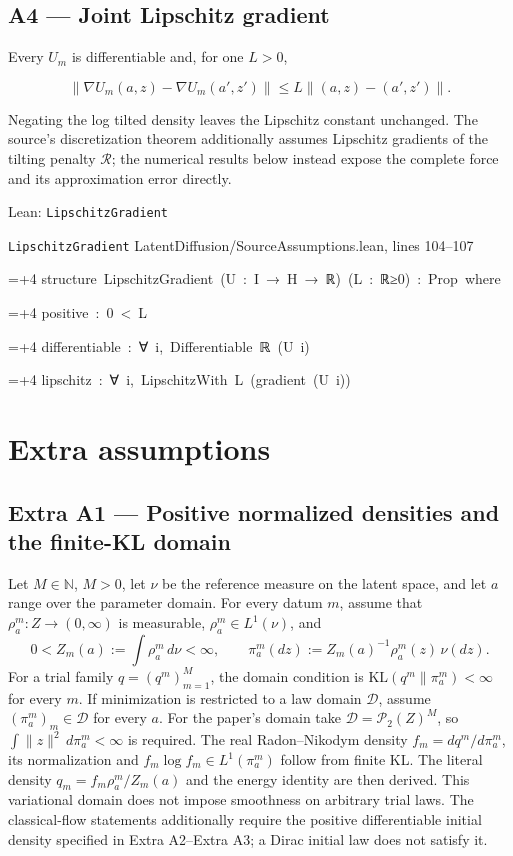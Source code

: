 \documentclass[11pt,a4paper]{report}
\newlength{\leancharwidth}
\newenvironment{leancode}{\par\smallskip\begingroup\ttfamily\footnotesize\raggedright
  \settowidth{\leancharwidth}{M}\setlength{\parskip}{0pt}\setlength{\parindent}{0pt}
  \frenchspacing}{\par\endgroup\smallskip}
\newcommand{\leanline}[2]{\hangindent=\dimexpr#1\leancharwidth+4\leancharwidth\relax
  \hangafter=1\noindent\hspace*{#1\leancharwidth}#2\par}
\newcommand{\leansource}[1]{\par{\footnotesize\color{leanmuted}#1}\par}
\begin{document}
\subsection{\texorpdfstring{A4 — Joint Lipschitz gradient}{A4 — Joint Lipschitz gradient}}



Every \(U_m\) is differentiable and, for one \(L>0\),



\[\|\nabla U_m(a,z)-\nabla U_m(a',z')\|\le L\|(a,z)-(a',z')\|.\]



Negating the log tilted density leaves the Lipschitz constant unchanged. The source's discretization theorem additionally assumes Lipschitz gradients of the tilting penalty \(\mathcal R\); the numerical results below instead expose the complete force and its approximation error directly.

\begin{leanbox}{Lean: \texttt{LipschitzGradient}}
\leansource{\texttt{LipschitzGradient} \quad LatentDiffusion/\allowbreak{}SourceAssumptions.lean, lines 104–107}
\begin{leancode}
\leanline{0}{structure\ LipschitzGradient\ (U\ :\ I\ →\ H\ →\ ℝ)\ (L\ :\ ℝ≥0)\ :\ Prop\ where}
\leanline{2}{positive\ :\ 0\ <\ L}
\leanline{2}{differentiable\ :\ ∀\ i,\ Differentiable\ ℝ\ (U\ i)}
\leanline{2}{lipschitz\ :\ ∀\ i,\ LipschitzWith\ L\ (gradient\ (U\ i))}
\end{leancode}
\end{leanbox}
\section{Extra assumptions}
\subsection{\texorpdfstring{Extra A1 — Positive normalized densities and the finite-KL domain}{Extra A1 — Positive normalized densities and the finite-KL domain}}


Let \(M\in\mathbb N\), \(M>0\), let \(\nu\) be the reference measure on the latent space, and let \(a\) range over the parameter domain. For every datum \(m\), assume that \(\rho_a^m:Z\to(0,\infty)\) is measurable, \(\rho_a^m\in L^1(\nu)\), and
        \[0<Z_m(a):=\int\rho_a^m\,d\nu<\infty,\qquad
          \pi_a^m(dz):=Z_m(a)^{-1}\rho_a^m(z)\,\nu(dz).\]
        For a trial family \(q=(q^m)_{m=1}^M\), the domain condition is
        \(\mathrm{KL}(q^m\|\pi_a^m)<\infty\) for every \(m\). If minimization is restricted to a law domain \(\mathcal D\), assume \((\pi_a^m)_m\in\mathcal D\) for every \(a\). For the paper's domain take \(\mathcal D=\mathcal P_2(Z)^M\), so \(\int\|z\|^2\,d\pi_a^m<\infty\) is required. The real Radon–Nikodym density \(f_m=dq^m/d\pi_a^m\), its normalization and \(f_m\log f_m\in L^1(\pi_a^m)\) follow from finite KL. The literal density \(q_m=f_m\rho_a^m/Z_m(a)\) and the energy identity are then derived. This variational domain does not impose smoothness on arbitrary trial laws. The classical-flow statements additionally require the positive differentiable initial density specified in Extra A2–Extra A3; a Dirac initial law does not satisfy it.
\end{document}
